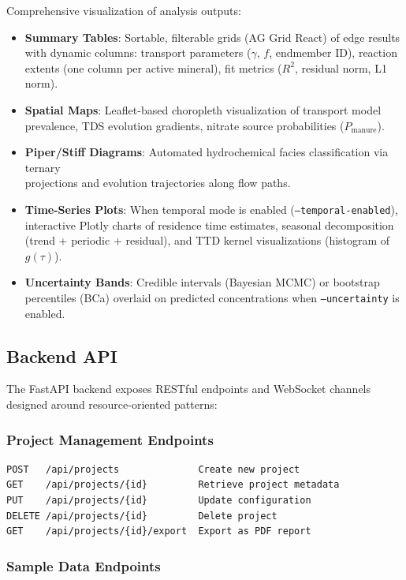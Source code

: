 Comprehensive visualization of analysis outputs:
\begin{itemize}
	\item \textbf{Summary Tables}: Sortable, filterable grids (AG Grid React) of edge results with dynamic columns: transport parameters ($\gamma$, $f$, endmember ID), reaction extents (one column per active mineral), fit metrics ($R^2$, residual norm, L1 norm).
	\item \textbf{Spatial Maps}: Leaflet-based choropleth visualization of transport model prevalence, TDS evolution gradients, nitrate source probabilities ($P_{\text{manure}}$).
	\item \textbf{Piper/Stiff Diagrams}: Automated hydrochemical facies classification via ternary\\projections and evolution trajectories along flow paths.
	\item \textbf{Time-Series Plots}: When temporal mode is enabled (\texttt{--temporal-enabled}), interactive Plotly charts of residence time estimates, seasonal decomposition (trend + periodic + residual), and TTD kernel visualizations (histogram of $g(\tau)$).
	\item \textbf{Uncertainty Bands}: Credible intervals (Bayesian MCMC) or bootstrap percentiles (BCa) overlaid on predicted concentrations when \texttt{--uncertainty} is enabled.
\end{itemize}

\subsection{Backend API}

The FastAPI backend exposes RESTful endpoints and WebSocket channels designed around resource-oriented patterns:

\subsubsection{Project Management Endpoints}

\begin{verbatim}
POST   /api/projects              Create new project
GET    /api/projects/{id}         Retrieve project metadata
PUT    /api/projects/{id}         Update configuration
DELETE /api/projects/{id}         Delete project
GET    /api/projects/{id}/export  Export as PDF report
\end{verbatim}

\subsubsection{Sample Data Endpoints}

